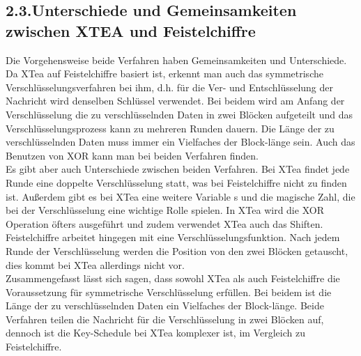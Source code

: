 \documentclass[course=asp]{aspdoc}
\begin{document}
\newpage
\subsection*{2.3.Unterschiede und Gemeinsamkeiten zwischen XTEA und Feistelchiffre}
Die Vorgehensweise beide Verfahren haben Gemeinsamkeiten und Unterschiede. Da XTea auf Feistelchiffre basiert ist, erkennt man auch das symmetrische Verschlüsselungsverfahren bei ihm, d.h. für die Ver- und Entschlüsselung der Nachricht wird denselben Schlüssel verwendet. Bei beidem wird am Anfang der Verschlüsselung die zu verschlüsselnden Daten in zwei Blöcken aufgeteilt und das Verschlüsselungsprozess kann zu mehreren Runden dauern. Die Länge der zu verschlüsselnden Daten muss immer ein Vielfaches der Block-länge sein. Auch das Benutzen von XOR kann man bei beiden Verfahren finden. \\
Es gibt aber auch Unterschiede zwischen beiden Verfahren. Bei XTea findet jede Runde eine doppelte Verschlüsselung statt, was bei Feistelchiffre nicht zu finden ist. Außerdem gibt es bei XTea eine weitere Variable s und die magische Zahl, die bei der Verschlüsselung eine wichtige Rolle spielen. In XTea wird die XOR Operation öfters ausgeführt und zudem verwendet XTea auch das Shiften. Feistelchiffre arbeitet hingegen mit eine Verschlüsselungsfunktion. Nach jedem Runde der Verschlüsselung werden die Position von den zwei Blöcken getauscht, dies kommt bei XTea allerdings nicht vor. \\
Zusammengefasst lässt sich sagen, dass sowohl XTea als auch Feistelchiffre die Voraussetzung für symmetrische Verschlüsselung erfüllen. Bei beidem ist die Länge der zu verschlüsselnden Daten ein Vielfaches der Block-länge. Beide Verfahren teilen die Nachricht für die Verschlüsselung in zwei Blöcken auf, dennoch ist die Key-Schedule bei XTea komplexer ist, im Vergleich zu Feistelchiffre.
\end{document}
